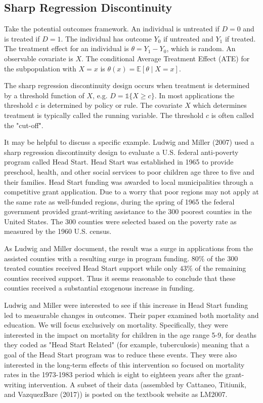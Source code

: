 \documentclass[10pt]{article}
\begin{document}
\subsection{Sharp Regression Discontinuity}
Take the potential outcomes framework. An individual is untreated if $D=0$ and is treated if $D=1$. The individual has outcome $Y_{0}$ if untreated and $Y_{1}$ if treated. The treatment effect for an individual is $\theta=Y_{1}-Y_{0}$, which is random. An observable covariate is $X$. The conditional Average Treatment Effect (ATE) for the subpopulation with $X=x$ is $\theta(x)=\mathbb{E}[\theta \mid X=x]$.

The sharp regression discontinuity design occurs when treatment is determined by a threshold function of $X$, e.g. $D=\mathbb{1}\{X \geq c\}$. In most applications the threshold $c$ is determined by policy or rule. The covariate $X$ which determines treatment is typically called the running variable. The threshold $c$ is often called the "cut-off".

It may be helpful to discuss a specific example. Ludwig and Miller (2007) used a sharp regression discontinuity design to evaluate a U.S. federal anti-poverty program called Head Start. Head Start was established in 1965 to provide preschool, health, and other social services to poor children age three to five and their families. Head Start funding was awarded to local municipalities through a competitive grant application. Due to a worry that poor regions may not apply at the same rate as well-funded regions, during the spring of 1965 the federal government provided grant-writing assistance to the 300 poorest counties in the United States. The 300 counties were selected based on the poverty rate as measured by the 1960 U.S. census.

As Ludwig and Miller document, the result was a surge in applications from the assisted counties with a resulting surge in program funding. $80 \%$ of the 300 treated counties received Head Start support while only $43 \%$ of the remaining counties received support. Thus it seems reasonable to conclude that these counties received a substantial exogenous increase in funding.

Ludwig and Miller were interested to see if this increase in Head Start funding led to measurable changes in outcomes. Their paper examined both mortality and education. We will focus exclusively on mortality. Specifically, they were interested in the impact on mortality for children in the age range 5-9, for deaths they coded as "Head Start Related" (for example, tuberculosis) meaning that a goal of the Head Start program was to reduce these events. They were also interested in the long-term effects of this intervention so focused on mortality rates in the 1973-1983 period which is eight to eighteen years after the grant-writing intervention. A subset of their data (assembled by Cattaneo, Titiunik, and VazquezBare (2017)) is posted on the textbook website as LM2007.
\end{document}
